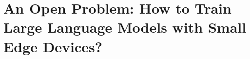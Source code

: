 






\section{An Open Problem: How to Train Large Language Models with Small Edge Devices?}\label{sec:open_problem}

